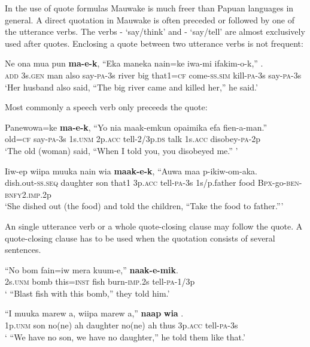 In the use of quote formulas Mauwake is much freer than Papuan languages in general. A direct quotation in Mauwake is often preceded or followed by one of the utterance verbs. The verbs - `say/think' and - `say/tell' are almost exclusively used after quotes. Enclosing a quote between two utterance verbs is not frequent:

\ea%
\label{ex:x1571}
\gll Ne  ona  mua  pun  \textbf{ma-e-k},  ``Eka  maneka  nain=ke iwa-mi  ifakim-o-k,''  .\\
\textsc{add} 3s.\textsc{gen} man  also  say-\textsc{pa}-3s river big  that1=\textsc{cf} come-\textsc{ss}.\textsc{sim} kill-\textsc{pa}-3s  say-\textsc{pa}-3s\\
\glt`Her husband also said, ``The big river came and killed her,'' he said.'
\z


Most commonly a speech verb only preceeds the quote:

\ea%
\label{ex:x1578}
\gll Panewowa=ke  \textbf{ma-e-k},  ``Yo  nia  maak-emkun  opaimika efa  fien-a-man.''\\
old=\textsc{cf} say-\textsc{pa}-3s 1s.\textsc{unm} 2p.\textsc{acc} tell-2/3p.\textsc{ds} talk 1s.\textsc{acc} disobey-\textsc{pa}-2p\\
\glt`The old (woman) said, ``When I told you, you disobeyed me.'' '
\z


\ea%
\label{ex:x1579}
\gll Iiw-ep  wiipa  muuka  nain  wia  \textbf{maak-e-k}, ``Auwa  maa  p-ikiw-om-aka.\\
dish.out-\textsc{ss}.\textsc{seq} daughter  son  that1 3p.\textsc{acc} tell-\textsc{pa}-3s 1s/p.father food \textsc{Bpx}-go-\textsc{ben}-\textsc{bnfy}2.\textsc{imp}.2p\\
\glt`She dished out (the food) and told the children, ``Take the food to father.''{}'
\z


An single utterance verb or a whole quote-closing clause may follow the quote. A quote-closing clause has to be used when the quotation consists of several sentences.

\ea%
\label{ex:x1580}
\gll ``No  bom  fain=iw  mera  kuum-e,''  \textbf{naak-e-mik}. \\
2s.\textsc{unm} bomb this=\textsc{inst} fish burn-\textsc{imp}.2s  tell-\textsc{pa}-1/3p\\
\glt` ``Blast fish with this bomb,'' they told him.'
\z


\ea%
\label{ex:x1583}
\gll ``I  muuka  marew  a,  wiipa  marew  a,''  \textbf{naap} \textbf{wia} .\\
1p.\textsc{unm} son  no(ne)  ah  daughter  no(ne)  ah  thus 3p.\textsc{acc} tell-\textsc{pa}-3s\\
\glt` ``We have no son, we have no daughter,'' he told them like that.'
\z


